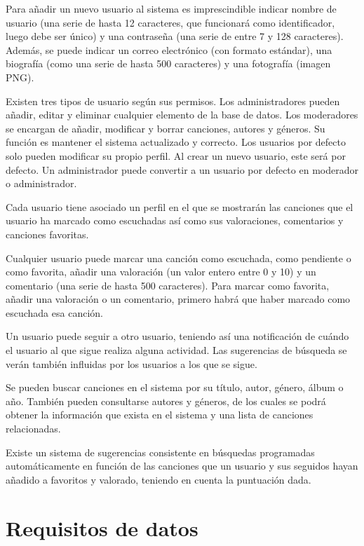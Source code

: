 \documentclass[
  12pt,
  a4paper,
  DIV=12,
  spanish,
]{scrartcl}
\begin{document}
Para añadir un nuevo usuario al sistema es imprescindible indicar nombre de usuario (una serie de hasta 12 caracteres, que funcionará como identificador, luego debe ser único) y una contraseña (una serie de entre 7 y 128 caracteres). Además, se puede indicar un correo electrónico (con formato estándar), una biografía (como una serie de hasta 500 caracteres) y una fotografía (imagen PNG).

Existen tres tipos de usuario según sus permisos. Los administradores pueden añadir, editar y eliminar cualquier elemento de la base de datos. Los moderadores se encargan de añadir, modificar y borrar canciones, autores y géneros. Su función es mantener el sistema actualizado y correcto. Los usuarios por defecto solo pueden modificar su propio perfil. Al crear un nuevo usuario, este será por defecto. Un administrador puede convertir a un usuario por defecto en moderador o administrador.

Cada usuario tiene asociado un perfil en el que se mostrarán las canciones que el usuario ha marcado como escuchadas así como sus valoraciones, comentarios y canciones favoritas.


Cualquier usuario puede marcar una canción como escuchada, como pendiente o como favorita, añadir una valoración (un valor entero entre 0 y 10) y un comentario (una serie de hasta 500 caracteres). Para marcar como favorita, añadir una valoración o un comentario, primero habrá que haber marcado como escuchada esa canción.

Un usuario puede seguir a otro usuario, teniendo así una notificación de cuándo el usuario al que sigue realiza alguna actividad. Las sugerencias de búsqueda se verán también influidas por los usuarios a los que se sigue.



Se pueden buscar canciones en el sistema por su título, autor, género, álbum o año. También pueden consultarse autores y géneros, de los cuales se podrá obtener la información que exista en el sistema y una lista de canciones relacionadas.

Existe un sistema de sugerencias consistente en búsquedas programadas automáticamente en función de las canciones que un usuario y sus seguidos hayan añadido a favoritos y valorado, teniendo en cuenta la puntuación dada.

\section{Requisitos de datos}
\end{document}
